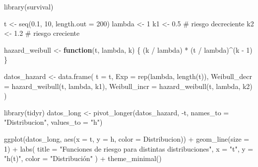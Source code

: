 \documentclass[
  letterpaper,
  DIV=11,
  numbers=noendperiod]{scrartcl}
\newenvironment{Shaded}{\begin{snugshade}}{\end{snugshade}}
\newcommand{\AttributeTok}[1]{\textcolor[rgb]{0.40,0.45,0.13}{#1}}
\newcommand{\CommentTok}[1]{\textcolor[rgb]{0.37,0.37,0.37}{#1}}
\newcommand{\ControlFlowTok}[1]{\textcolor[rgb]{0.00,0.23,0.31}{\textbf{#1}}}
\newcommand{\DecValTok}[1]{\textcolor[rgb]{0.68,0.00,0.00}{#1}}
\newcommand{\FloatTok}[1]{\textcolor[rgb]{0.68,0.00,0.00}{#1}}
\newcommand{\FunctionTok}[1]{\textcolor[rgb]{0.28,0.35,0.67}{#1}}
\newcommand{\NormalTok}[1]{\textcolor[rgb]{0.00,0.23,0.31}{#1}}
\newcommand{\OtherTok}[1]{\textcolor[rgb]{0.00,0.23,0.31}{#1}}
\newcommand{\SpecialCharTok}[1]{\textcolor[rgb]{0.37,0.37,0.37}{#1}}
\newcommand{\StringTok}[1]{\textcolor[rgb]{0.13,0.47,0.30}{#1}}
\begin{document}
\begin{Shaded}
\begin{Highlighting}[]
\FunctionTok{library}\NormalTok{(survival)}

\NormalTok{t }\OtherTok{\textless{}{-}} \FunctionTok{seq}\NormalTok{(}\FloatTok{0.1}\NormalTok{, }\DecValTok{10}\NormalTok{, }\AttributeTok{length.out =} \DecValTok{200}\NormalTok{)}
\NormalTok{lambda }\OtherTok{\textless{}{-}} \DecValTok{1}
\NormalTok{k1 }\OtherTok{\textless{}{-}} \FloatTok{0.5}  \CommentTok{\# riesgo decreciente}
\NormalTok{k2 }\OtherTok{\textless{}{-}} \FloatTok{1.2}    \CommentTok{\# riesgo creciente}

\NormalTok{hazard\_weibull }\OtherTok{\textless{}{-}} \ControlFlowTok{function}\NormalTok{(t, lambda, k) \{}
\NormalTok{  (k }\SpecialCharTok{/}\NormalTok{ lambda) }\SpecialCharTok{*}\NormalTok{ (t }\SpecialCharTok{/}\NormalTok{ lambda)}\SpecialCharTok{\^{}}\NormalTok{(k }\SpecialCharTok{{-}} \DecValTok{1}\NormalTok{)}
\NormalTok{\}}

\NormalTok{datos\_hazard }\OtherTok{\textless{}{-}} \FunctionTok{data.frame}\NormalTok{(}
  \AttributeTok{t =}\NormalTok{ t,}
  \AttributeTok{Exp =} \FunctionTok{rep}\NormalTok{(lambda, }\FunctionTok{length}\NormalTok{(t)),}
  \AttributeTok{Weibull\_decr =} \FunctionTok{hazard\_weibull}\NormalTok{(t, lambda, k1),}
  \AttributeTok{Weibull\_incr =} \FunctionTok{hazard\_weibull}\NormalTok{(t, lambda, k2)}
\NormalTok{)}

\FunctionTok{library}\NormalTok{(tidyr)}
\NormalTok{datos\_long }\OtherTok{\textless{}{-}} \FunctionTok{pivot\_longer}\NormalTok{(datos\_hazard, }\SpecialCharTok{{-}}\NormalTok{t, }\AttributeTok{names\_to =} \StringTok{"Distribucion"}\NormalTok{, }\AttributeTok{values\_to =} \StringTok{"h"}\NormalTok{)}

\FunctionTok{ggplot}\NormalTok{(datos\_long, }\FunctionTok{aes}\NormalTok{(}\AttributeTok{x =}\NormalTok{ t, }\AttributeTok{y =}\NormalTok{ h, }\AttributeTok{color =}\NormalTok{ Distribucion)) }\SpecialCharTok{+}
  \FunctionTok{geom\_line}\NormalTok{(}\AttributeTok{size =} \DecValTok{1}\NormalTok{) }\SpecialCharTok{+}
  \FunctionTok{labs}\NormalTok{(}
    \AttributeTok{title =} \StringTok{"Funciones de riesgo para distintas distribuciones"}\NormalTok{,}
    \AttributeTok{x =} \StringTok{"t"}\NormalTok{,}
    \AttributeTok{y =} \StringTok{"h(t)"}\NormalTok{,}
    \AttributeTok{color =} \StringTok{"Distribución"}
\NormalTok{  ) }\SpecialCharTok{+}
  \FunctionTok{theme\_minimal}\NormalTok{()}
\end{Highlighting}
\end{Shaded}
\end{document}
